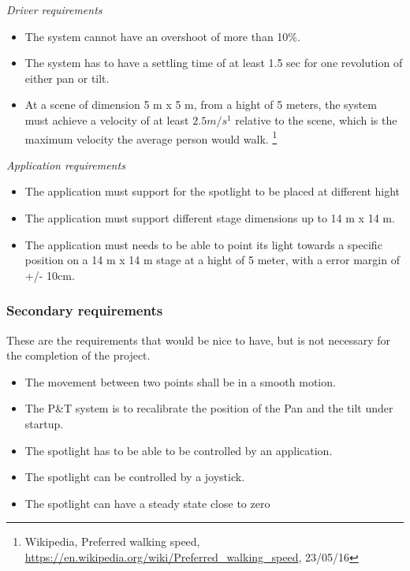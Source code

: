 \textit{Driver requirements}
\begin{itemize}
\item The system cannot have an overshoot of more than 10\%.

\item The system has to have a settling time of at least 1.5 sec for one revolution of either pan or tilt.	

\item At a scene of dimension 5 m x 5 m, from a hight of 5 meters, the system must achieve a velocity of at least $2.5 m/s^{1}$ relative to the scene, which is the maximum velocity the average person would walk. 
\footnote{Wikipedia, Preferred walking speed, \url{https://en.wikipedia.org/wiki/Preferred_walking_speed}, 23/05/16}

\end{itemize}


\textit{Application requirements}
\begin{itemize}


\item The application must support for the spotlight to be placed at different hight

\item The application must support different stage dimensions up to 14 m x 14 m. 

\item The application must needs to be able to point its light towards a specific position on a 14 m x 14 m stage at a hight of 5 meter, with a error margin of +/- 10cm. 
\end{itemize}


\subsubsection{Secondary requirements}
These are the requirements that would be nice to have, but is not necessary for the completion of the project. 

\begin{itemize}
\item The movement between two points shall be in a smooth motion.

\item The P\&T system is to recalibrate the position of the Pan and the tilt under startup.

\item The spotlight has to be able to be controlled by an application.

\item The spotlight can be controlled by a joystick.

\item The spotlight can have a steady state close to zero
\end{itemize}
